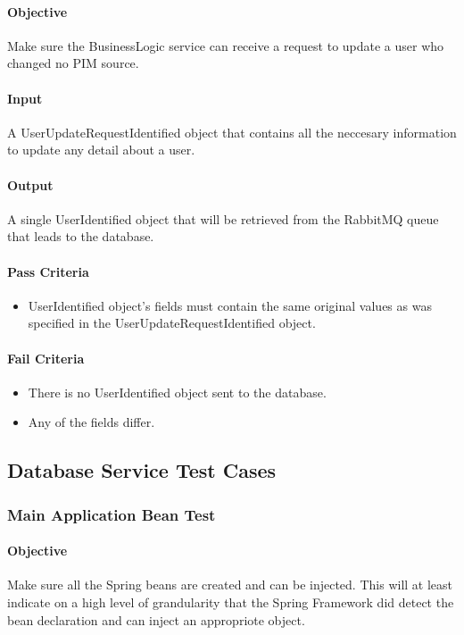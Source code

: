 \documentclass[hidelinks,english]{article}
\begin{document}
				\paragraph{Objective} Make sure the BusinessLogic service can receive a request to update a user who changed no PIM source.
				\paragraph{Input} A UserUpdateRequestIdentified object that contains all the neccesary information to update any detail about a user.
				\paragraph{Output} A single UserIdentified object that will be retrieved from the RabbitMQ queue that leads to the database.
				\paragraph{Pass Criteria}
				\begin{itemize}
					\item UserIdentified object's fields must contain the same original values as was specified in the UserUpdateRequestIdentified object.
				\end{itemize}
				\paragraph{Fail Criteria}
				\begin{itemize}
					\item There is no UserIdentified object sent to the database.
					\item Any of the fields differ.
				\end{itemize}
				
		\subsection{Database Service Test Cases}
			\subsubsection{Main Application Bean Test}\label{databaseapplicationbeanstest}
				\paragraph{Objective} Make sure all the Spring beans are created and can be injected. This will at least indicate on a high level of grandularity that the Spring Framework did detect the bean declaration and can inject an appropriote object.
\end{document}

